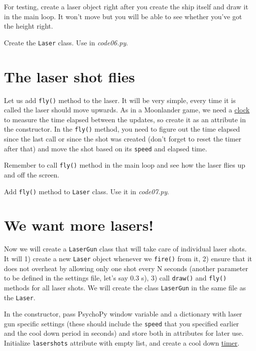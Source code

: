 \documentclass[
]{book}
\begin{document}
For testing, create a laser object right after you create the ship itself and draw it in the main loop. It won't move but you will be able to see whether you've got the height right.

Create the \texttt{Laser} class.
Use in \emph{code06.py}.

\hypertarget{the-laser-shot-flies}{%
\section{The laser shot flies}\label{the-laser-shot-flies}}

Let us add \texttt{fly()} method to the laser. It will be very simple, every time it is called the laser should move upwards. As in a Moonlander game, we need a \href{https://psychopy.org/api/clock.html\#psychopy.clock.Clock}{clock} to measure the time elapsed between the updates, so create it as an attribute in the constructor. In the \texttt{fly()} method, you need to figure out the time elapsed since the last call or since the shot was created (don't forget to reset the timer after that) and move the shot based on its \texttt{speed} and elapsed time.

Remember to call \texttt{fly()} method in the main loop and see how the laser flies up and off the screen.

Add \texttt{fly()} method to \texttt{Laser} class.
Use it in \emph{code07.py}.

\hypertarget{we-want-more-lasers}{%
\section{We want more lasers!}\label{we-want-more-lasers}}

Now we will create a \texttt{LaserGun} class that will take care of individual laser shots. It will 1) create a new \texttt{Laser} object whenever we \texttt{fire()} from it, 2) ensure that it does not overheat by allowing only one shot every N seconds (another parameter to be defined in the settings file, let's say 0.3 s), 3) call \texttt{draw()} and \texttt{fly()} methods for all laser shots. We will create the class \texttt{LaserGun} in the same file as the \texttt{Laser}.

In the constructor, pass PsychoPy window variable and a dictionary with laser gun specific settings (these should include the \texttt{speed} that you specified earlier and the cool down period in seconds) and store both in attributes for later use. Initialize \texttt{lasershots} attribute with empty list, and create a cool down \href{https://psychopy.org/api/clock.html\#psychopy.clock.CountdownTimer}{timer}.
\end{document}
